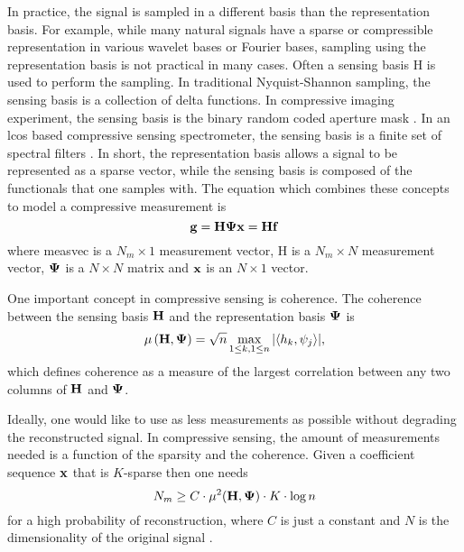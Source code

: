 In practice, the signal is sampled in a different basis than the representation basis. For example, while many natural signals have a sparse or compressible representation in various wavelet bases or Fourier bases, sampling using the representation basis is not practical in many cases. Often a sensing basis \gls{H} is used to perform the sampling. In traditional Nyquist-Shannon sampling, the sensing basis is a collection of delta functions. In compressive imaging experiment, the sensing basis is the binary random coded aperture mask \cite{duarte2008single}. In an \gls{lcos} based compressive sensing spectrometer, the sensing basis is a finite set of spectral filters \cite{oiknine2016along, yuan2015compressive}. In short, the representation basis allows a signal to be represented as a sparse vector, while the sensing basis is composed of the functionals that one samples with. The equation which combines these concepts to model a compressive measurement is
%
\begin{equation}
	\mathbf{g} = \mathbf{H} \mathbf{\Psi} \mathbf{x} = \mathbf{H} \mathbf{f}
	\label{eq:gHf2}
\end{equation}
%
where \gls{measvec} is a $N_m \times 1$ measurement vector, \gls{H} is a $N_m \times N$ measurement vector, $\mathbf{\Psi}$ is a $N \times N$ matrix and $\mathbf{x}$ is an $N \times 1$ vector. 

One important concept in \gls{compressive sensing} is coherence. The coherence between the sensing basis $\mathbf{H}$ and the representation basis $\mathbf{\Psi}$ is
\begin{equation}
	\mu \left( \mathbf{H}, \mathbf{\Psi} \right) = \sqrt{n} \max_{1 \leq k, 1 \leq n}  | \langle h_k, \psi_j \rangle | ,
	\label{eq:coherenceDef1}
\end{equation}
which defines coherence as a measure of the largest correlation between any two columns of $\mathbf{H}$ and $\mathbf{\Psi}$. 

Ideally, one would like to use as less measurements as possible without degrading the reconstructed signal. In \gls{compressive sensing}, the amount of measurements needed is a function of the sparsity and the coherence. Given a coefficient sequence $\mathbf{x}$ that is $K$-sparse then one needs
\begin{equation}
N_m \geq C \cdot \mu^2 ( \mathbf{H} , \mathbf{\Psi} ) \cdot K \cdot \log n
\label{eq:minMeas1}
\end{equation}
for a high probability of reconstruction, where $C$ is just a constant and $N$ is the dimensionality of the original signal \cite{candes2008introduction}.

